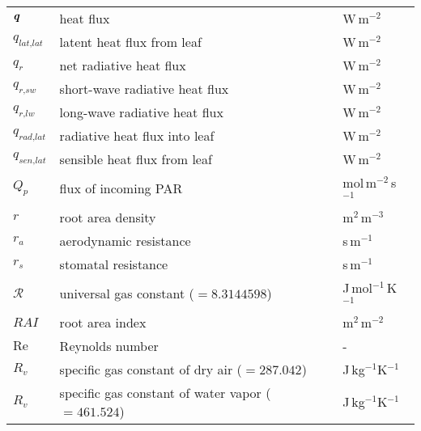 \begin{longtable}{p{}p{}p{}}
	$\textbf{\textit{q}}$ & heat flux & W\,m$^{-2}$\\ 	
	$q_{\textit{lat,lat}}$ & latent heat flux from leaf & W\,m$^{-2}$\\ 	
	$q_{\textit{r}}$ & net radiative heat flux & W\,m$^{-2}$\\ 	
	$q_{\textit{r,sw}}$ & short-wave radiative heat flux & W\,m$^{-2}$\\ 	
	$q_{\textit{r,lw}}$ & long-wave radiative heat flux & W\,m$^{-2}$\\ 		
	$q_{\textit{rad,lat}}$ & radiative heat flux into leaf & W\,m$^{-2}$\\ 		
	$q_{\textit{sen,lat}}$ & sensible heat flux from leaf & W\,m$^{-2}$\\ 
	
	$Q_p$ & flux of incoming PAR & mol\,m$^{-2}$\,s$^{-1}$ \\ 
	$r$ & root area density & m$^{2}$\,m$^{-3}$ \\ 	
	$r_a$ & aerodynamic resistance & s\,m$^{-1}$\\ 
	$r_s$ & stomatal resistance & s\,m$^{-1}$\\ 	
	$\mathcal{R}$ & universal gas constant ($=\num{8.3144598}$) & J\,mol$^{-1}$\,K$^{-1}$ \\ 
	$\textit{RAI}$ & root area index & m$^{2}$\,m$^{-2}$ \\ 	
	${\textrm{Re}}$ & Reynolds number & - \\ 
	$R_v$ & specific gas constant of dry air ($=\num{287.042}$) & J\,kg$^{-1}$K$^{-1}$ \\ 
	$R_v$ & specific gas constant of water vapor ($=\num{461.524}$) & J\,kg$^{-1}$K$^{-1}$ \\ 

\end{longtable}
